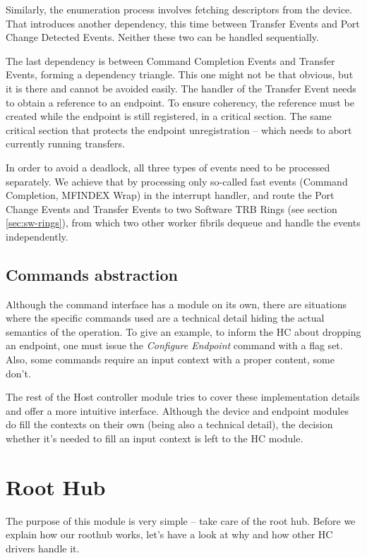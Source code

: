 Similarly, the enumeration process involves fetching descriptors from the
device. That introduces another dependency, this time between Transfer
Events and Port Change Detected Events. Neither these two can be handled
sequentially.

The last dependency is between Command Completion Events and Transfer Events,
forming a dependency triangle. This one might not be that obvious, but it is
there and cannot be avoided easily. The handler of the Transfer Event needs to
obtain a reference to an endpoint. To ensure coherency, the reference must be
created while the endpoint is still registered, in a critical section. The same
critical section that protects the endpoint unregistration -- which needs to
abort currently running transfers.

In order to avoid a deadlock, all three types of events need to be processed
separately. We achieve that by processing only so-called fast events (Command
Completion, MFINDEX Wrap) in the interrupt handler, and route the Port Change
Events and Transfer Events to two Software TRB Rings (see section \ref{sec:sw-rings}),
from which two other worker fibrils dequeue and handle the events independently.

\subsection{Commands abstraction}

Although the command interface has a module on its own, there are situations
where the specific commands used are a technical detail hiding the actual
semantics of the operation. To give an example, to inform the HC about dropping
an endpoint, one must issue the \emph{Configure Endpoint} command with a flag
set. Also, some commands require an input context with a proper content, some don't.

The rest of the Host controller module tries to cover these implementation
details and offer a more intuitive interface. Although the device and endpoint
modules do fill the contexts on their own (being also a technical detail), the
decision whether it's needed to fill an input context is left to the HC module.

\section{Root Hub}

The purpose of this module is very simple -- take care of the root hub. Before
we explain how our roothub works, let's have a look at why and how other HC
drivers handle it.

